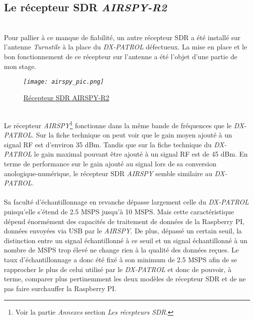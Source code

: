\documentclass[12pt,fleqn]{book} %
\begin{document}
\subsection{Le récepteur SDR \emph{AIRSPY-R2}}
~\\Pour pallier à ce manque de fiabilité, un autre récepteur SDR a été installé sur l'antenne \emph{Turnstile} à la place du \emph{DX-PATROL} défectueux. La mise en place et le bon fonctionnement de ce récepteur sur l'antenne a été l'objet d'une partie de mon stage.
\begin{figure}[H]
	\centering
	\itshape
	\texttt{[image: airspy\_pic.png]}
	\caption{\label{airspy_pic} \underline{Récepteur SDR AIRSPY-R2}}
\end{figure}
~\\Le récepteur \emph{AIRSPY}\footnote{Voir la partie \emph{Annexes} section \emph{Les récepteurs SDR}.} fonctionne dans la même bande de fréquences que le \emph{DX-PATROL}. Sur la fiche technique on peut voir que le gain moyen ajouté à un signal RF est d'environ 35 dBm. Tandis que sur la fiche technique du \emph{DX-PATROL} le gain maximal pouvant être ajouté à un signal RF est de 45 dBm.
En terme de performance sur le gain ajouté au signal lors de sa conversion anologique-numérique, le récepteur SDR \emph{AIRSPY} semble similaire au \emph{DX-PATROL}.
~\\\\Sa faculté d'échantillonnage en revanche dépasse largement celle du \emph{DX-PATROL} puisqu'elle s'étend de 2.5 MSPS jusqu'à 10 MSPS. Mais cette caractéristique dépend énormément des capacités de traitement de données de la Raspberry PI, données envoyées via USB par le \emph{AIRSPY}. De plus, dépassé un certain seuil, la distinction entre un signal échantillonné à ce seuil et un signal échantillonné à un nombre de MSPS trop élevé ne change rien à la qualité des données reçues.
Le taux d'échantillonnage a donc été fixé à son minimum de 2.5 MSPS afin de se rapprocher le plus de celui utilisé par le \emph{DX-PATROL} et donc de pouvoir, à terme, comparer plus pertinemment les deux modèles de récepteur SDR et de ne pas faire surchauffer la Raspberry PI.
\end{document}
